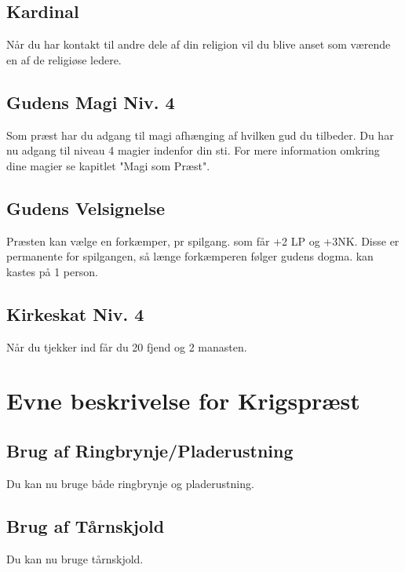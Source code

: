

\subsection*{Kardinal}
Når du har kontakt til andre dele af din religion vil du blive anset som værende en af de religiøse ledere.

\subsection*{Gudens Magi Niv. 4}
Som præst har du adgang til magi afhænging af hvilken gud du tilbeder. Du har nu adgang til niveau 4 magier indenfor din sti. For mere information omkring dine magier se kapitlet "Magi som Præst".

\subsection*{Gudens Velsignelse}
Præsten kan vælge en forkæmper, pr spilgang. som får +2 LP og +3NK. Disse er permanente for spilgangen, så længe forkæmperen følger gudens dogma. kan kastes på 1 person.

\subsection*{Kirkeskat Niv. 4}
Når du tjekker ind får du 20 fjend og 2 manasten.


\section*{Evne beskrivelse for Krigspræst}

\subsection*{Brug af Ringbrynje/Pladerustning}
Du kan nu bruge både ringbrynje og pladerustning. 

\subsection*{Brug af Tårnskjold}
Du kan nu bruge tårnskjold.


